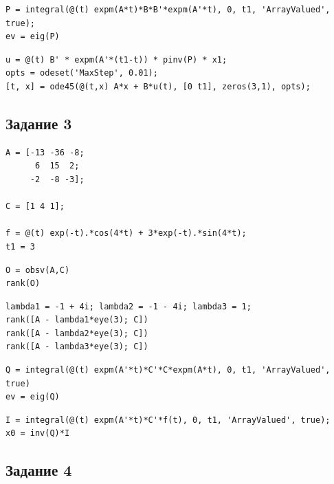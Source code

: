 \documentclass[a4paper,12pt]{article}
\begin{document}
\begin{lstlisting}[caption={Грамиан управляемости}, label={lst:gram2}]
P = integral(@(t) expm(A*t)*B*B'*expm(A'*t), 0, t1, 'ArrayValued', true);
ev = eig(P)
\end{lstlisting}

\begin{lstlisting}[caption={Синтез управления}, label={lst:control2}]
u = @(t) B' * expm(A'*(t1-t)) * pinv(P) * x1;
opts = odeset('MaxStep', 0.01);
[t, x] = ode45(@(t,x) A*x + B*u(t), [0 t1], zeros(3,1), opts);
\end{lstlisting}

\newpage
\subsection*{Задание 3}

\begin{lstlisting}[caption={Инициализация}]
A = [-13 -36 -8;
	  6  15  2;
	 -2  -8 -3];

C = [1 4 1];

f = @(t) exp(-t).*cos(4*t) + 3*exp(-t).*sin(4*t);
t1 = 3
\end{lstlisting}

\begin{lstlisting}[caption={Вычисление ранга матрицы наблюдаемости}, label={lst:nabl}]
O = obsv(A,C)
rank(O)
\end{lstlisting}

\begin{lstlisting}[caption={Вычисление рангов матриц Хаутуса}, label={lst:haut3}]
lambda1 = -1 + 4i; lambda2 = -1 - 4i; lambda3 = 1;
rank([A - lambda1*eye(3); C])
rank([A - lambda2*eye(3); C])
rank([A - lambda3*eye(3); C])
\end{lstlisting}

\begin{lstlisting}[caption={Грамиан наблюдаемости}, label={lst:gram_nabl}]
Q = integral(@(t) expm(A'*t)*C'*C*expm(A*t), 0, t1, 'ArrayValued', true)
ev = eig(Q)
\end{lstlisting}

\begin{lstlisting}[caption={Вычисление начальных условий}, label={lst:init_state}]
I = integral(@(t) expm(A'*t)*C'*f(t), 0, t1, 'ArrayValued', true);
x0 = inv(Q)*I
\end{lstlisting}

\newpage
\subsection*{Задание 4}
\end{document}

